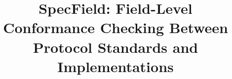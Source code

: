 \documentclass[conference]{IEEEtran}
\begin{document}
\makeatletter
\newcommand{\projectinput}[1]{%
  \InputIfFileExists{#1}{}{%
    \InputIfFileExists{../#1}{}{%
      \PackageError{SpecField}{File `#1' not found}{%
        Keep the section file next to the workspace root or one level above the
        main TeX file.%
      }%
    }%
  }%
}
\newcommand{\projectbibliography}[1]{%
  \IfFileExists{#1.bib}{%
  }{%
    \IfFileExists{../#1.bib}{%
    }{%
      \PackageError{SpecField}{Bibliography file `#1.bib' not found}{%
        Keep the bibliography file next to the workspace root or one level
        above the main TeX file.%
      }%
    }%
  }%
}
\makeatother

\newcommand{\tool}{SpecField}
\newcommand{\ruleform}{$\langle F, C, A \rangle$}

\date{}

\title{\tool: Field-Level Conformance Checking Between Protocol Standards and Implementations}


\end{document}
